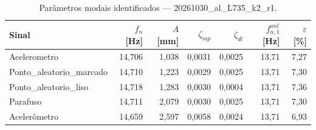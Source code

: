 \begin{table}[htbp]
  \centering
  \caption{Parâmetros modais identificados — 20261030\_al\_L735\_k2\_r1.}
  \label{tab:modal_20261030_al_L735_k2_r1}
  \begin{tabular}{lrrrrrr}
    \toprule
    Sinal & $f_n$ [Hz] & $A$ [mm] & $\zeta_{mp}$ & $\zeta_{dl}$ & $f_{n,1}^{anl}$ [Hz] & $\varepsilon$ [\%] \\
    \midrule
    Acelerometro & 14{,}706 & 1{,}038 & 0{,}0031 & 0{,}0025 & 13{,}71 & 7{,}27 \\
    Ponto\_aleatorio\_marcado & 14{,}710 & 1{,}223 & 0{,}0029 & 0{,}0025 & 13{,}71 & 7{,}30 \\
    Ponto\_aleatorio\_liso & 14{,}718 & 1{,}283 & 0{,}0030 & 0{,}0004 & 13{,}71 & 7{,}36 \\
    Parafuso & 14{,}711 & 2{,}079 & 0{,}0030 & 0{,}0025 & 13{,}71 & 7{,}30 \\
    Acelerômetro & 14{,}659 & 2{,}597 & 0{,}0058 & 0{,}0024 & 13{,}71 & 6{,}93 \\
    \bottomrule
  \end{tabular}
\end{table}
